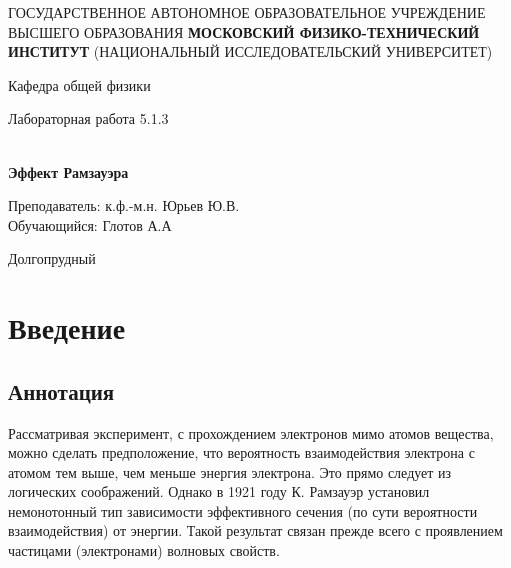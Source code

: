 \documentclass[12pt,a4paper]{article}
\author{Глотов Алексей}
\begin{document}
\newpage
\begin{center}
\footnotesize{{ГОСУДАРСТВЕННОЕ АВТОНОМНОЕ ОБРАЗОВАТЕЛЬНОЕ УЧРЕЖДЕНИЕ}\break
{ВЫСШЕГО ОБРАЗОВАНИЯ}
\break
{\bf {МОСКОВСКИЙ ФИЗИКО-ТЕХНИЧЕСКИЙ ИНСТИТУТ}}
\break
\small{(НАЦИОНАЛЬНЫЙ ИССЛЕДОВАТЕЛЬСКИЙ УНИВЕРСИТЕТ)}}
\break
\hfill \break
\hfill \break
\begin{center}
\normalsize{Кафедра общей физики}
\end{center}
\hfill \break
\hfill \break
\hfill \break
\hfill \break

\begin{center}
\normalsize {Лабораторная работа 5.1.3}
\end{center}
\hfill \break\\
\large{\textbf{Эффект Рамзауэра}}
\end{center}
\begin{flushleft}
\hfill \break
\hfill \break
\hfill \break
\hfill \break
\hfill \break
\hfill \break
\hfill \break
\hfill \break
\hfill \break
\hfill \break
\hangindent=10cm
\normalsize{Преподаватель:} \;\;\;\;
\normalsize{к.ф.-м.н. Юрьев Ю.В.}\\
\hfill \break
\normalsize{Обучающийся:} \;\;\;\;\;
\normalsize{Глотов А.А} \\
\hfill \break
\end{flushleft}
\hfill \break
\hfill \break
\hfill \break
\hfill \break
\hfill \break
\hfill \break
\hfill \break
\hfill \break
\hfill \break
\hfill \break
\hfill \break

\begin{center}
Долгопрудный 
\end{center}

\thispagestyle{empty}


\newpage
\section{Введение}

\subsection{Аннотация}

Рассматривая эксперимент, с прохождением электронов мимо атомов вещества, можно сделать предположение, что вероятность взаимодействия электрона с атомом тем выше, чем меньше энергия электрона. Это прямо следует из логических соображений. Однако в 1921 году К. Рамзауэр установил немонотонный тип зависимости эффективного сечения (по сути вероятности взаимодействия) от энергии. Такой результат связан прежде всего с проявлением частицами (электронами) волновых свойств.
\end{document}
